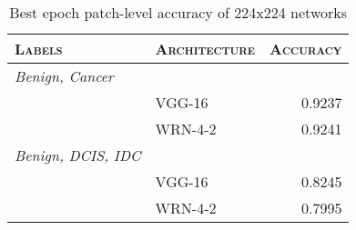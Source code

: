 
\begin{table}[!t]
\renewcommand{\arraystretch}{1.1}
\caption{Best epoch patch-level accuracy of 224x224 networks}
\label{table_results_224}
\centering
\begin{tabular}{|llr|}
\hline
\textsc{Labels}&\textsc{Architecture}&\textsc{Accuracy}\\
\hline
\textit{Benign, Cancer}&&\\
&VGG-16&  0.9237\\
&WRN-4-2& 0.9241\\
\hline
\textit{Benign, DCIS, IDC}&&\\
&VGG-16& 0.8245\\
&WRN-4-2& 0.7995\\
\hline
\end{tabular}
\end{table}

